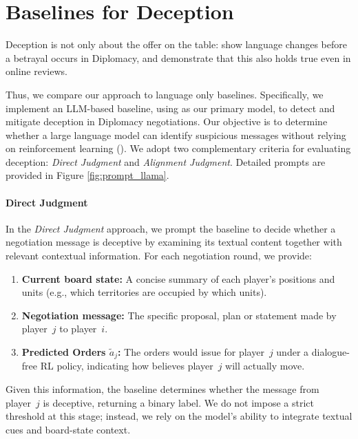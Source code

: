 
\section{Baselines for Deception}
\label{sec:llama}

Deception is not only about the offer on the table: \citet{niculae-etal-2015-linguistic} show language changes before a betrayal occurs in Diplomacy, and \citet{lai2020chicago} demonstrate that this also holds true even in online reviews.

Thus, we compare our approach to language only baselines. Specifically, we implement an LLM-based baseline, using  as our primary model, to detect and mitigate deception in Diplomacy negotiations. Our objective is to determine whether a large language model can identify suspicious messages without relying on reinforcement learning (). We adopt two complementary criteria for evaluating deception: \emph{Direct Judgment} and \emph{Alignment Judgment}. Detailed prompts are provided in Figure \ref{fig:prompt_llama}.

\paragraph{Direct Judgment}
In the \emph{Direct Judgment} approach, we prompt the baseline to decide whether a negotiation message is deceptive by examining its textual content together with relevant contextual information. For each negotiation round, we provide:
\begin{enumerate}
    \item \textbf{Current board state:} A concise summary of each player's positions and units (e.g., which territories are occupied by which units).
    \item \textbf{Negotiation message:} The specific proposal, plan or statement made by player~\(j\) to player~\(i\).
    \item \textbf{Predicted Orders \(\tilde{a}_j\):} The orders \cicero would issue for player~\(j\) under a dialogue-free RL policy, indicating how \cicero believes player~\(j\) will actually move.
\end{enumerate}
Given this information, the baseline determines whether the message from player~\(j\) is deceptive, returning a binary label. We do not impose a strict threshold at this stage; instead, we rely on the model’s ability to integrate textual cues and board-state context.

